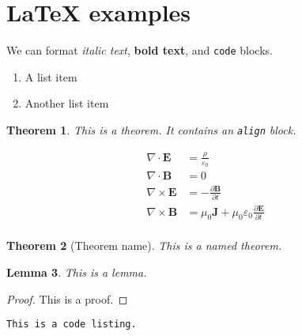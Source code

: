 \documentclass[12pt]{amsart}
\theoremstyle{plain}%
\newtheorem{thm}{Theorem}[section]
\newtheorem{lem}[thm]{Lemma}
\begin{document}
\section{LaTeX examples}

We can format \emph{italic text}, \textbf{bold text}, and \texttt{code} blocks.

\begin{enumerate}
    \item A list item
    \item Another list item
\end{enumerate}

\begin{thm}
    This is a theorem.  It contains an \texttt{align} block.
    
    \begin{align*}
        \nabla \cdot \mathbf{E} &= \frac {\rho} {\varepsilon_0} \\
        \nabla \cdot \mathbf{B} &= 0 \\
        \nabla \times \mathbf{E} &= -\frac{\partial \mathbf{B}} {\partial t} \\
        \nabla \times \mathbf{B} &= \mu_0 \mathbf{J} + \mu_0 \varepsilon_0 \frac{\partial \mathbf{E}} {\partial t} \\
    \end{align*}
\end{thm}

\begin{thm}[Theorem name]
    This is a named theorem.
\end{thm}

\begin{lem}
    This is a lemma.
\end{lem}

\begin{proof}
    This is a proof.
\end{proof}

\begin{lstlisting}
This is a code listing.
\end{lstlisting}
\end{document}
